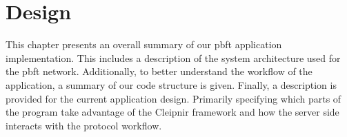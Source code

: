 \chapter{Design}
\label{chapter:Design}

\iffalse
This chapter presents an overall summary of our \ac{pbft} application implementation. This includes a description of the system architecture used for the \ac{pbft} network. Additionally, to better understand the workflow of the application, a summary of our code structure is given. Finally, a description is provided for the current application design. Primarily specifying which parts of the program take advantage of the Cleipnir framework and how the server side interacts with the protocol workflow.
